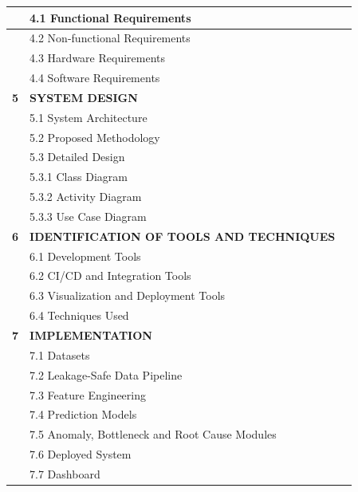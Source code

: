 {\begin{longtable}{|>{\centering\arraybackslash}p{1.1cm}|p{11.6cm}|>{\centering\arraybackslash}p{1.4cm}|}
 & 4.1 Functional Requirements & \pageref{sec:functional}\\ \hline
 & 4.2 Non-functional Requirements & \pageref{sec:nonfunctional}\\ \hline
 & 4.3 Hardware Requirements & \pageref{sec:hardware}\\ \hline
 & 4.4 Software Requirements & \pageref{sec:software}\\ \hline
\textbf{5} & \textbf{SYSTEM DESIGN} & \textbf{\pageref{ch:design}}\\ \hline
 & 5.1 System Architecture & \pageref{sec:architecture}\\ \hline
 & 5.2 Proposed Methodology & \pageref{sec:methodology}\\ \hline
 & 5.3 Detailed Design & \pageref{sec:detailed}\\ \hline
 & \hspace{1.2em}5.3.1 Class Diagram & \pageref{sec:class}\\ \hline
 & \hspace{1.2em}5.3.2 Activity Diagram & \pageref{sec:activity}\\ \hline
 & \hspace{1.2em}5.3.3 Use Case Diagram & \pageref{sec:usecase}\\ \hline
\textbf{6} & \textbf{IDENTIFICATION OF TOOLS AND TECHNIQUES} & \textbf{\pageref{ch:tools}}\\ \hline
 & 6.1 Development Tools & \pageref{sec:devtools}\\ \hline
 & 6.2 CI/CD and Integration Tools & \pageref{sec:citools}\\ \hline
 & 6.3 Visualization and Deployment Tools & \pageref{sec:viztools}\\ \hline
 & 6.4 Techniques Used & \pageref{sec:techniques}\\ \hline
\textbf{7} & \textbf{IMPLEMENTATION} & \textbf{\pageref{ch:impl}}\\ \hline
 & 7.1 Datasets & \pageref{sec:datasets}\\ \hline
 & 7.2 Leakage-Safe Data Pipeline & \pageref{sec:pipeline}\\ \hline
 & 7.3 Feature Engineering & \pageref{sec:features}\\ \hline
 & 7.4 Prediction Models & \pageref{sec:models}\\ \hline
 & 7.5 Anomaly, Bottleneck and Root Cause Modules & \pageref{sec:aux}\\ \hline
 & 7.6 Deployed System & \pageref{sec:deployed}\\ \hline
 & 7.7 Dashboard & \pageref{sec:dashboard}\\ \hline

\end{longtable}}
